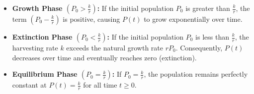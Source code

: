 \begin{itemize}
    \item \textbf{Growth Phase $\left(P_0 > \frac{k}{r}\right)$:} 
    If the initial population $P_0$ is greater than $\frac{k}{r}$, the term $\left(P_0 - \frac{k}{r}\right)$ is positive, causing $P(t)$ to grow exponentially over time.

    \item \textbf{Extinction Phase $\left(P_0 < \frac{k}{r}\right)$:} 
    If the initial population $P_0$ is less than $\frac{k}{r}$, the harvesting rate $k$ exceeds the natural growth rate $rP_0$. Consequently, $P(t)$ decreases over time and eventually reaches zero (extinction).

    \item \textbf{Equilibrium Phase $\left(P_0 = \frac{k}{r}\right)$:} 
    If $P_0 = \frac{k}{r}$, the population remains perfectly constant at $P(t) = \frac{k}{r}$ for all time $t \ge 0$.
\end{itemize}